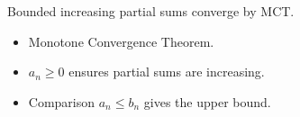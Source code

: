 \begin{remark*}
Bounded increasing partial sums converge by MCT.
\end{remark*}

\begin{remark*}[Dependencies]
\begin{itemize}
  \item Monotone Convergence Theorem.
  \item $a_n \ge 0$ ensures partial sums are increasing.
  \item Comparison $a_n \le b_n$ gives the upper bound.
\end{itemize}
\end{remark*}

